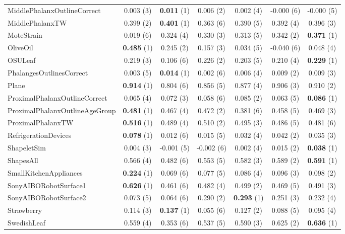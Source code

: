 \begin{table}[ht]
\begin{adjustbox}{width=\textwidth}
\begin{tabular}{lcccccc}
    MiddlePhalanxOutlineCorrect & 0.003 (3) & \textbf{0.011} (1) & 0.006 (2) & 0.002 (4) & -0.000 (6) & -0.000 (5) \\
    MiddlePhalanxTW & 0.399 (2) & \textbf{0.401} (1) & 0.363 (6) & 0.390 (5) & 0.392 (4) & 0.396 (3) \\
    MoteStrain & 0.019 (6) & 0.324 (4) & 0.330 (3) & 0.313 (5) & 0.342 (2) & \textbf{0.371} (1) \\
    OliveOil & \textbf{0.485} (1) & 0.245 (2) & 0.157 (3) & 0.034 (5) & -0.040 (6) & 0.048 (4) \\
    OSULeaf & 0.219 (3) & 0.106 (6) & 0.226 (2) & 0.203 (5) & 0.210 (4) & \textbf{0.229} (1) \\
    PhalangesOutlinesCorrect & 0.003 (5) & \textbf{0.014} (1) & 0.002 (6) & 0.006 (4) & 0.009 (2) & 0.009 (3) \\
    Plane & \textbf{0.914} (1) & 0.804 (6) & 0.856 (5) & 0.877 (4) & 0.906 (3) & 0.910 (2) \\
    ProximalPhalanxOutlineCorrect & 0.065 (4) & 0.072 (3) & 0.058 (6) & 0.085 (2) & 0.063 (5) & \textbf{0.086} (1) \\
    ProximalPhalanxOutlineAgeGroup & \textbf{0.481} (1) & 0.467 (4) & 0.472 (2) & 0.381 (6) & 0.458 (5) & 0.469 (3) \\
    ProximalPhalanxTW & \textbf{0.516} (1) & 0.489 (4) & 0.510 (2) & 0.495 (3) & 0.486 (5) & 0.481 (6) \\
    RefrigerationDevices & \textbf{0.078} (1) & 0.012 (6) & 0.015 (5) & 0.032 (4) & 0.042 (2) & 0.035 (3) \\
    ShapeletSim & 0.004 (3) & -0.001 (5) & -0.002 (6) & 0.002 (4) & 0.015 (2) & \textbf{0.038} (1) \\
    ShapesAll & 0.566 (4) & 0.482 (6) & 0.553 (5) & 0.582 (3) & 0.589 (2) & \textbf{0.591} (1) \\
    SmallKitchenAppliances & \textbf{0.224} (1) & 0.069 (6) & 0.077 (5) & 0.086 (4) & 0.096 (3) & 0.098 (2) \\
    SonyAIBORobotSurface1 & \textbf{0.626} (1) & 0.461 (6) & 0.482 (4) & 0.499 (2) & 0.469 (5) & 0.491 (3) \\
    SonyAIBORobotSurface2 & 0.073 (5) & 0.064 (6) & 0.290 (2) & \textbf{0.293} (1) & 0.251 (3) & 0.232 (4) \\
    Strawberry & 0.114 (3) & \textbf{0.137} (1) & 0.055 (6) & 0.127 (2) & 0.088 (5) & 0.095 (4) \\
    SwedishLeaf & 0.559 (4) & 0.353 (6) & 0.537 (5) & 0.590 (3) & 0.625 (2) & \textbf{0.636} (1) \\

\end{tabular}
\end{adjustbox}
\end{table}
